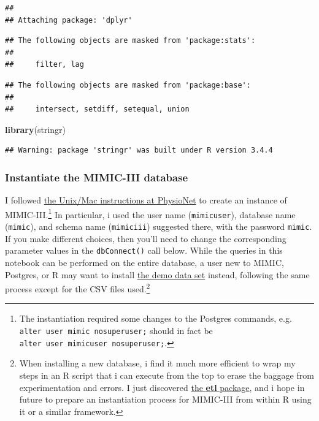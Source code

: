 \documentclass[]{article}
\newenvironment{Shaded}{\begin{snugshade}}{\end{snugshade}}
\newcommand{\KeywordTok}[1]{\textcolor[rgb]{0.13,0.29,0.53}{\textbf{#1}}}
\newcommand{\NormalTok}[1]{#1}
\let\rmarkdownfootnote\footnote%
\def\footnote{\protect\rmarkdownfootnote}
\begin{document}
\begin{verbatim}
## 
## Attaching package: 'dplyr'
\end{verbatim}

\begin{verbatim}
## The following objects are masked from 'package:stats':
## 
##     filter, lag
\end{verbatim}

\begin{verbatim}
## The following objects are masked from 'package:base':
## 
##     intersect, setdiff, setequal, union
\end{verbatim}

\begin{Shaded}
\begin{Highlighting}[]
\KeywordTok{library}\NormalTok{(stringr)}
\end{Highlighting}
\end{Shaded}

\begin{verbatim}
## Warning: package 'stringr' was built under R version 3.4.4
\end{verbatim}

\subsubsection{Instantiate the MIMIC-III
database}\label{instantiate-the-mimic-iii-database}

I followed
\href{https://mimic.mit.edu/docs/gettingstarted/local/install-mimic-locally-ubuntu.html}{the
Unix/Mac instructions at PhysioNet} to create an instance of
MIMIC-III.\footnote{The instantiation required some changes to the
  Postgres commands, e.g. \texttt{alter\ user\ mimic\ nosuperuser;}
  should in fact be \texttt{alter\ user\ mimicuser\ nosuperuser;}.} In
particular, i used the user name (\texttt{mimicuser}), database name
(\texttt{mimic}), and schema name (\texttt{mimiciii}) suggested there,
with the password \texttt{mimic}. If you make different choices, then
you'll need to change the corresponding parameter values in the
\texttt{dbConnect()} call below. While the queries in this notebook can
be performed on the entire database, a user new to MIMIC, Postgres, or R
may want to install
\href{https://mimic.mit.edu/docs/III/demo.html}{the demo data
set} instead, following the same process except for the CSV files
used.\footnote{When installing a new database, i find it much more
  efficient to wrap my steps in an R script that i can execute from the
  top to erase the baggage from experimentation and errors. I just
  discovered \href{https://cran.r-project.org/package=etl}{the
  \textbf{etl} package}, and i hope in future to prepare an
  instantiation process for MIMIC-III from within R using it or a
  similar framework.}
\end{document}
